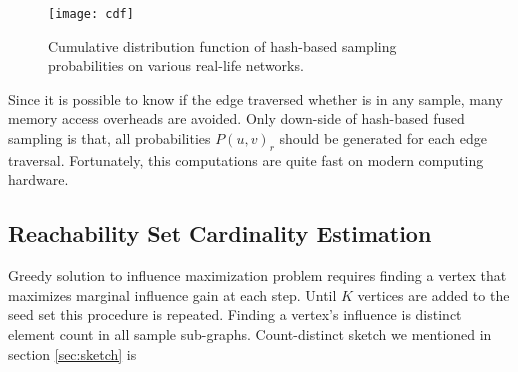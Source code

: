 \documentclass[10pt,journal,compsoc]{IEEEtran}
\begin{document}
\begin{figure}[!ht] 
    \centering
    \texttt{[image: cdf]}
    \caption{Cumulative distribution function of hash-based sampling probabilities on various real-life networks.}
    \label{fig:prob_cdf} 
\end{figure}

Since it is possible to know if the edge traversed whether is in any sample, many memory access overheads are avoided. Only down-side of hash-based fused sampling is that, all probabilities $P(u,v)_r$  should be generated for each edge traversal. Fortunately, this computations are quite fast on modern computing hardware.

\subsection{Reachability Set Cardinality Estimation}

Greedy solution to influence maximization problem requires finding a vertex that maximizes marginal influence gain at each step. Until $K$ vertices are added to the seed set this procedure is repeated. 
Finding a vertex's influence is distinct element count in all sample sub-graphs. Count-distinct sketch we mentioned in section \ref{sec:sketch} is 
\end{document}
